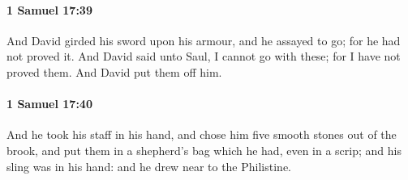 		\paragraph{1 Samuel 17:39} %
			\label{1SAMUEL-17-39}

			And David girded his sword upon his armour, and he assayed to go; for he had not proved it. And David said unto Saul, I cannot go with these; for I have not proved them. And David put them off him.


		\paragraph{1 Samuel 17:40} %
			\label{1SAMUEL-17-40}

			And he took his staff in his hand, and chose him five smooth stones out of the brook, and put them in a shepherd’s bag which he had, even in a scrip; and his sling was in his hand: and he drew near to the Philistine.

